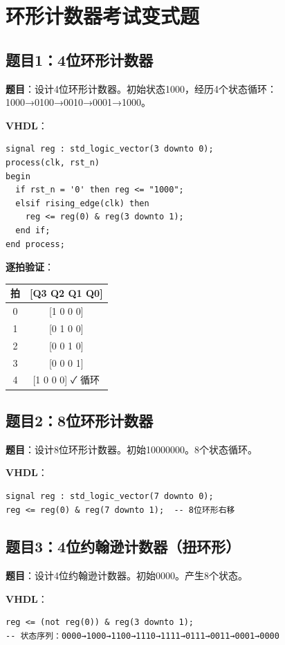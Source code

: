 \chapter{环形计数器考试变式题}

\section*{题目1：4位环形计数器}

\textbf{题目}：设计4位环形计数器。初始状态1000，经历4个状态循环：1000→0100→0010→0001→1000。

\textbf{VHDL}：
\begin{lstlisting}
signal reg : std_logic_vector(3 downto 0);
process(clk, rst_n)
begin
  if rst_n = '0' then reg <= "1000";
  elsif rising_edge(clk) then
    reg <= reg(0) & reg(3 downto 1);
  end if;
end process;
\end{lstlisting}

\textbf{逐拍验证}：
\begin{center}
\begin{tabular}{|c|c|}
\hline
拍 & [Q3 Q2 Q1 Q0] \\
\hline
0 & [1 0 0 0] \\
1 & [0 1 0 0] \\
2 & [0 0 1 0] \\
3 & [0 0 0 1] \\
4 & [1 0 0 0] ✓ 循环 \\
\hline
\end{tabular}
\end{center}

\section*{题目2：8位环形计数器}

\textbf{题目}：设计8位环形计数器。初始10000000。8个状态循环。

\textbf{VHDL}：
\begin{lstlisting}
signal reg : std_logic_vector(7 downto 0);
reg <= reg(0) & reg(7 downto 1);  -- 8位环形右移
\end{lstlisting}

\section*{题目3：4位约翰逊计数器（扭环形）}

\textbf{题目}：设计4位约翰逊计数器。初始0000。产生8个状态。

\textbf{VHDL}：
\begin{lstlisting}
reg <= (not reg(0)) & reg(3 downto 1);
-- 状态序列：0000→1000→1100→1110→1111→0111→0011→0001→0000
\end{lstlisting}

